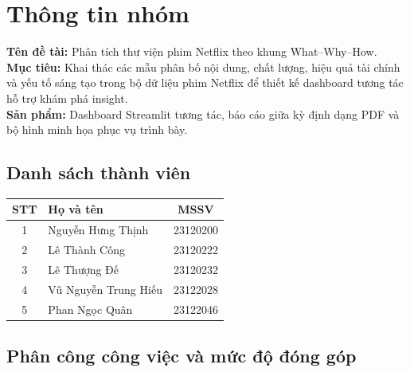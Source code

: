 \section{Thông tin nhóm}

\textbf{Tên đề tài:} Phân tích thư viện phim Netflix theo khung What--Why--How. \\
\textbf{Mục tiêu:} Khai thác các mẫu phân bố nội dung, chất lượng, hiệu quả tài chính và yếu tố sáng tạo trong bộ dữ liệu phim Netflix để thiết kế dashboard tương tác hỗ trợ khám phá insight. \\
\textbf{Sản phẩm:} Dashboard Streamlit tương tác, báo cáo giữa kỳ định dạng PDF và bộ hình minh họa phục vụ trình bày.

\subsection{Danh sách thành viên}

\begin{center}
    \renewcommand{\arraystretch}{1.3}
    \begin{tabular}{|c|p{6cm}|c|}
        \hline
        \textbf{STT} & \textbf{Họ và tên} & \textbf{MSSV} \\
        \hline
        1 & Nguyễn Hưng Thịnh & 23120200 \\
        \hline
        2 & Lê Thành Công & 23120222 \\
        \hline
        3 & Lê Thượng Đế & 23120232 \\
        \hline
        4 & Vũ Nguyễn Trung Hiếu & 23122028 \\
        \hline
        5 & Phan Ngọc Quân & 23122046 \\
        \hline
    \end{tabular}
\end{center}

\subsection{Phân công công việc và mức độ đóng góp}

